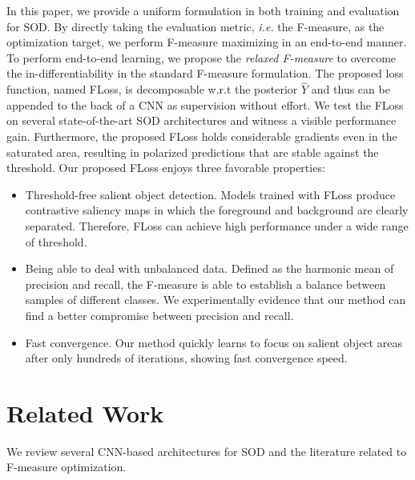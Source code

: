 \documentclass[10pt,twocolumn,letterpaper]{article}
\begin{document}
In this paper, we  provide a uniform formulation %
in both training and evaluation for SOD.
%
By directly taking the evaluation metric,
\emph{i.e.} the F-measure, as the optimization target,
we perform F-measure maximizing in an end-to-end manner.
%
To perform end-to-end learning,
we propose the \emph{relaxed F-measure} to overcome the in-differentiability
in the standard F-measure formulation.
%
The proposed loss function, named FLoss, is decomposable
w.r.t the posterior $\hat{Y}$ and
thus can be appended to the back of a CNN as supervision without effort.
%
We test the FLoss on several state-of-the-art SOD
architectures and witness a visible performance gain.
%
Furthermore, the proposed FLoss holds considerable gradients even in the saturated area,
resulting in polarized predictions that are stable against the threshold.
%
Our proposed FLoss enjoys three favorable properties:\vspace{-3pt}
\begin{itemize}[noitemsep]
  \item Threshold-free salient object detection.
  Models trained with FLoss produce contrastive saliency maps in which
  the foreground and background are clearly separated.
  Therefore,
  FLoss can achieve high performance under a wide range of threshold.

  \item Being able to deal with unbalanced data.
  Defined as the harmonic mean of precision and recall, the F-measure is able to establish a
  balance between samples of different classes.
  We experimentally evidence that our method can find a better compromise between
  precision and recall.

  \item Fast convergence. Our method quickly learns to focus on
  salient object areas after only hundreds of iterations,
  showing fast convergence speed.
\end{itemize}
\section{Related Work}
We review several CNN-based architectures for SOD and
the literature related to F-measure optimization.
\end{document}
